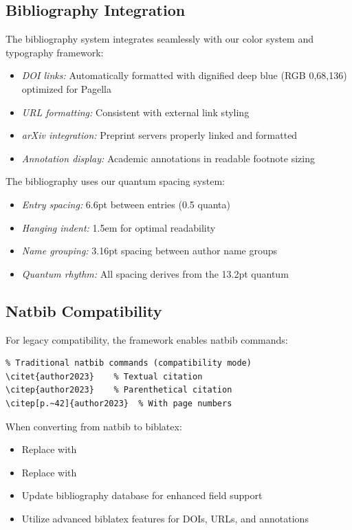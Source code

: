 \documentclass[11pt]{article}
\begin{document}
\subsection{Bibliography Integration}

The bibliography system integrates seamlessly with our color system and typography framework:

\begin{itemize}
\item \emph{DOI links:} Automatically formatted with dignified deep blue (RGB 0,68,136) optimized for Pagella
\item \emph{URL formatting:} Consistent with external link styling
\item \emph{arXiv integration:} Preprint servers properly linked and formatted
\item \emph{Annotation display:} Academic annotations in readable footnote sizing
\end{itemize}

The bibliography uses our quantum spacing system:
\begin{itemize}
\item \emph{Entry spacing:} 6.6pt between entries (0.5 quanta)
\item \emph{Hanging indent:} 1.5em for optimal readability
\item \emph{Name grouping:} 3.16pt spacing between author name groups
\item \emph{Quantum rhythm:} All spacing derives from the 13.2pt quantum
\end{itemize}

\subsection{Natbib Compatibility}

For legacy compatibility, the framework enables natbib commands:

\begin{verbatim}
% Traditional natbib commands (compatibility mode)
\citet{author2023}    % Textual citation
\citep{author2023}    % Parenthetical citation
\citep[p.~42]{author2023}  % With page numbers
\end{verbatim}

 When converting from natbib to biblatex:
\begin{itemize}
\item Replace  with 
\item Replace  with 
\item Update bibliography database for enhanced field support
\item Utilize advanced biblatex features for DOIs, URLs, and annotations
\end{itemize}
\end{document}
